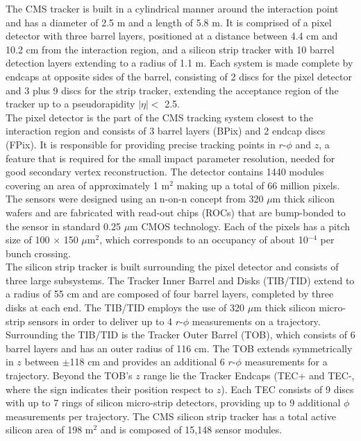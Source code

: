 The CMS tracker is built in a cylindrical manner around the interaction point and has a diameter of 2.5 m and a length of 5.8 m. It is comprised of a pixel detector with three barrel layers, positioned at a distance between 4.4 cm and 10.2 cm from the interaction region, and a silicon strip tracker with 10 barrel detection layers extending to a radius of 1.1 m. Each system is made complete by endcaps at opposite sides of the barrel, consisting of 2 discs for the pixel detector and 3 plus 9 discs for the strip tracker, extending the acceptance region of the tracker up to a pseudorapidity $|\eta| <$ 2.5.\\

The pixel detector is the part of the CMS tracking system closest to the interaction region and consists of 3 barrel layers (BPix) and 2 endcap discs (FPix). It is responsible for providing precise tracking points in $r$-$\phi$ and $z$, a feature that is required for the small impact parameter resolution, needed for good secondary vertex reconstruction. The detector contains 1440 modules covering an area of approximately 1 m$^2$ making up a total of 66 million pixels. The sensors were designed using an n-on-n concept from 320 $\mu$m thick silicon wafers and are fabricated with read-out chips (ROCs) that are bump-bonded to the sensor in standard 0.25 $\mu$m CMOS technology. Each of the pixels has a pitch size of 100 $\times$ 150 $\mu$m$^2$, which corresponds to an occupancy of about 10$^{-4}$ per bunch crossing.\\

The silicon strip tracker is built surrounding the pixel detector and consists of three large subsystems. The Tracker Inner Barrel and Disks (TIB/TID) extend to a radius of 55 cm and are composed of four barrel layers, completed by three disks at each end. The TIB/TID employs the use of 320 $\mu$m thick silicon micro-strip sensors in order to deliver up to 4 $r$-$\phi$ measurements on a trajectory. Surrounding the TIB/TID is the Tracker Outer Barrel (TOB), which consists of 6 barrel layers and has an outer radius of 116 cm. The TOB extends symmetrically in $z$ between $\pm$118 cm and provides an additional 6 $r$-$\phi$ measurements for a trajectory. Beyond the TOB's $z$ range lie the Tracker Endcaps (TEC+ and TEC-, where the sign indicates their position respect to $z$). Each TEC consists of 9 discs with up to 7 rings of silicon micro-strip detectors, providing up to 9 additional $\phi$ measurements per trajectory. The CMS silicon strip tracker has a total active silicon area of 198 m$^2$ and is composed of 15,148 sensor modules.

